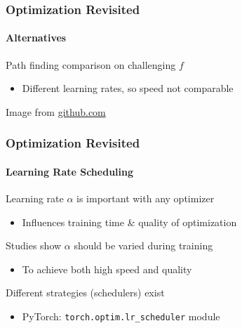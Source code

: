 \documentclass[xetex,professionalfont]{beamer}
\renewcommand\emph[1]{\textcolor{tuwcvl_cvl_blue}{#1}}
\begin{document}
\begin{frame}
  \frametitle{Optimization Revisited}
  \framesubtitle{Alternatives}
  
  Path finding comparison on challenging $f$
  \begin{itemize}
      \item Different learning rates, so speed not comparable
  \end{itemize}
  
  \medskip
  
  \begin{center}
  {\centering Image from \href{https://github.com/wassname/viz_torch_optim}{github.com}}
  \end{center}
  
  \end{frame}


\begin{frame}
  \frametitle{Optimization Revisited}
  \framesubtitle{Learning Rate Scheduling}
  
Learning rate $\alpha$ is important with any optimizer
\begin{itemize}
  \item Influences training time \& quality of optimization %
\end{itemize}

\bigskip

Studies show $\alpha$ should be varied during training
\begin{itemize}
  \item To achieve both high speed and quality
\end{itemize}

\bigskip

Different strategies (\emph{schedulers}) exist
\begin{itemize}
  \item PyTorch: \texttt{torch.optim.lr\_scheduler} module
\end{itemize}
  
\end{frame}
\end{document}
